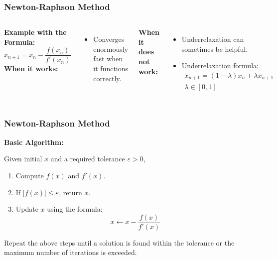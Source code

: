 \begin{frame}[fragile]
    \frametitle{Newton-Raphson Method}
    \vspace{-0.4cm}
    \begin{columns}
    \textbf{Example with the Formula:}
      \[
      x_{n+1} = x_n - \frac{f(x_n)}{f'(x_n)}
      \]
    \textbf{When it works:}
    \begin{itemize}
        \item Converges enormously fast when it functions correctly.
    \end{itemize}
    
    \textbf{When it does not work:}
    \begin{itemize}
        \item Underrelaxation can sometimes be helpful.
        \item Underrelaxation formula:
        \begin{align*}
        x_{n+1} = (1-\lambda)x_n + \lambda x_{n+1}\\
        \lambda \in [0,1]  
        \end{align*}
    \end{itemize}
    
    
   \end{columns}
\end{frame}


\begin{frame}[fragile]
    \frametitle{Newton-Raphson Method}
    \textbf{Basic Algorithm:}

    Given initial \( x \) and a required tolerance \( \varepsilon > 0 \),
    \begin{enumerate}
        \item Compute \( f(x) \) and \( f'(x) \).
        \item If \( |f(x)| \leq \varepsilon \), return \( x \).
        \item Update \( x \) using the formula:
        \[
        x \leftarrow x - \frac{f(x)}{f'(x)}
        \]
    \end{enumerate}
    Repeat the above steps until a solution is found within the tolerance or the maximum number of iterations is exceeded.
\end{frame}


